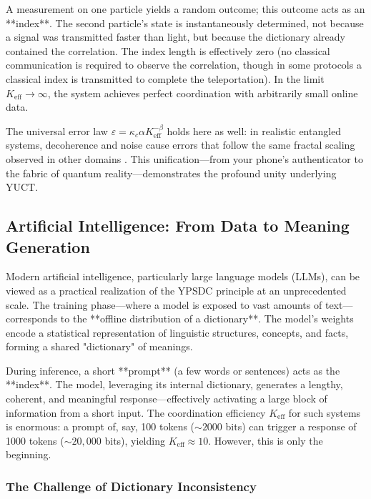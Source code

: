 \documentclass[12pt,a4paper]{article}
\theoremstyle{remark}
\newcommand{\Keff}{K_{\mathrm{eff}}}
\begin{document}
	A measurement on one particle yields a random outcome; this outcome acts as an **index**. The second particle's state is instantaneously determined, not because a signal was transmitted faster than light, but because the dictionary already contained the correlation. The index length is effectively zero (no classical communication is required to observe the correlation, though in some protocols a classical index is transmitted to complete the teleportation). In the limit $\Keff \to \infty$, the system achieves perfect coordination with arbitrarily small online data.
	
	The universal error law $\varepsilon = \kappa_c \alpha \Keff^{-\beta}$ holds here as well: in realistic entangled systems, decoherence and noise cause errors that follow the same fractal scaling observed in other domains \cite{AppendixG, AppendixS}. This unification—from your phone's authenticator to the fabric of quantum reality—demonstrates the profound unity underlying YUCT.
	
	\subsection{Artificial Intelligence: From Data to Meaning Generation}
	
	Modern artificial intelligence, particularly large language models (LLMs), can be viewed as a practical realization of the YPSDC principle at an unprecedented scale. The training phase—where a model is exposed to vast amounts of text—corresponds to the **offline distribution of a dictionary**. The model's weights encode a statistical representation of linguistic structures, concepts, and facts, forming a shared "dictionary" of meanings.
	
	During inference, a short **prompt** (a few words or sentences) acts as the **index**. The model, leveraging its internal dictionary, generates a lengthy, coherent, and meaningful response—effectively activating a large block of information from a short input. The coordination efficiency $\Keff$ for such systems is enormous: a prompt of, say, 100 tokens ($\sim 2000$ bits) can trigger a response of 1000 tokens ($\sim 20,000$ bits), yielding $\Keff \approx 10$. However, this is only the beginning.
	
	\subsubsection{The Challenge of Dictionary Inconsistency}
	
\end{document}
